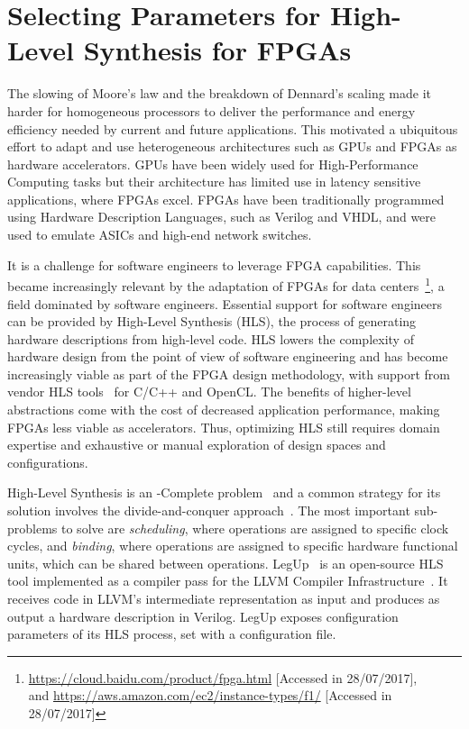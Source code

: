 \section{Selecting Parameters for High-Level Synthesis for FPGAs}
\label{sec:FPGA}

The slowing of Moore's law and the breakdown of Dennard's scaling made it
harder for homogeneous processors to deliver the performance and energy
efficiency needed by current and future applications. This motivated a
ubiquitous effort to adapt and use heterogeneous architectures such as GPUs and
FPGAs as hardware accelerators.  GPUs have been widely used for
High-Performance Computing tasks but their architecture has limited use in
latency sensitive applications, where FPGAs excel.  FPGAs have been
traditionally programmed using Hardware Description Languages, such as Verilog
and VHDL, and were used to emulate ASICs and high-end network switches.

It is a challenge for software engineers to leverage FPGA capabilities.  This
became increasingly relevant by the adaptation of FPGAs for data
centers~\cite{caulfield2016cloud}\footnote{\url{https://cloud.baidu.com/product/fpga.html}
[Accessed in 28/07/2017], \\ and
\url{https://aws.amazon.com/ec2/instance-types/f1/} [Accessed in 28/07/2017]},
a field dominated by software engineers. Essential support for software
engineers can be provided by High-Level Synthesis (HLS), the process of
generating hardware descriptions from high-level code.  HLS lowers the
complexity of hardware design from the point of view of software engineering
and has become increasingly viable as part of the FPGA design methodology, with
support from vendor HLS tools~\cite{singh2011implementing, feist2012vivado} for
C/C++ and OpenCL. The benefits of higher-level abstractions come with the cost
of decreased application performance, making FPGAs less viable as accelerators.
Thus, optimizing HLS still requires domain expertise and exhaustive or manual
exploration of design spaces and configurations.

High-Level Synthesis is an \NP{}-Complete problem~\cite{canis2015legup} and a
common strategy for its solution involves the divide-and-conquer
approach~\cite{coussy2009introduction}.  The most important sub-problems to
solve are \textit{scheduling}, where operations are assigned to specific clock
cycles, and \textit{binding}, where operations are assigned to specific
hardware functional units, which can be shared between operations.
LegUp~\cite{canis2013legup} is an open-source HLS tool implemented as a
compiler pass for the LLVM Compiler Infrastructure~\cite{chris2004llvm}.  It
receives code in LLVM's intermediate representation as input and produces as
output a hardware description in Verilog.  LegUp exposes configuration
parameters of its HLS process, set with a configuration file.

